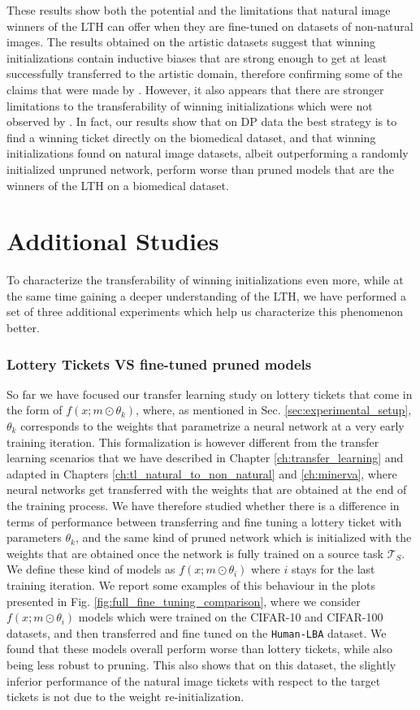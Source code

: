 These results show both the potential and the limitations that natural image winners of the LTH can offer when they are fine-tuned on datasets of non-natural images. The results obtained on the artistic datasets suggest that winning initializations contain inductive biases that are strong enough to get at least successfully transferred to the artistic domain, therefore confirming some of the claims that were made by \citet{morcos2019one}. However, it also appears that there are stronger limitations to the transferability of winning initializations which were not observed by \citet{morcos2019one}. In fact, our results show that on DP data the best strategy is to find a winning ticket directly on the biomedical dataset, and that winning initializations found on natural image datasets, albeit outperforming a randomly initialized unpruned network, perform worse than pruned models that are the winners of the LTH on a biomedical dataset.

\section{Additional Studies}
\label{sec:additional_studies}
To characterize the transferability of winning initializations even more, while at the same time gaining a deeper understanding of the LTH, we have performed a set of three additional experiments which help us characterize this phenomenon better. 

\subsubsection{Lottery Tickets VS fine-tuned pruned models}
So far we have focused our transfer learning study on lottery tickets that come in the form of $f(x;m\odot\theta_k)$, where, as mentioned in Sec. \ref{sec:experimental_setup}, $\theta_k$ corresponds to the weights that parametrize a neural network at a very early training iteration. This formalization is however different from the transfer learning scenarios that we have described in Chapter \ref{ch:transfer_learning} and adapted in Chapters \ref{ch:tl_natural_to_non_natural} and \ref{ch:minerva}, where neural networks get transferred with the weights that are obtained at the end of the training process. We have therefore studied whether there is a difference in terms of performance between transferring and fine tuning a lottery ticket with parameters $\theta_k$, and the same kind of pruned network which is initialized with the weights that are obtained once the network is fully trained on a source task $\mathcal{T}_S$. We define these kind of models as $f(x;m\odot\theta_i)$ where $i$ stays for the last training iteration. We report some examples of this behaviour in the plots presented in Fig. \ref{fig:full_fine_tuning_comparison}, where we consider $f(x;m\odot\theta_i)$ models which were trained on the CIFAR-10 and CIFAR-100 datasets, and then transferred and fine tuned on the \texttt{Human-LBA} dataset. We found that these models overall perform worse than lottery tickets, while also being less robust to pruning. This also shows that on this dataset, the slightly inferior performance of the natural image tickets with respect to the target tickets is not due to the weight re-initialization.

